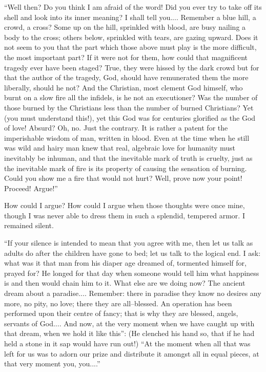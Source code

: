 \documentclass[11pt,openany]{book}
\begin{document}
``Well then? Do you think I am afraid of the word! Did you ever try to take off its shell and look into its inner meaning? I shall tell you.... Remember a blue hill, a crowd, a cross? Some up on the hill, sprinkled with blood, are busy nailing a body to the cross; others below, sprinkled with tears, are gazing upward. Does it not seem to you that the part which those above must play is the more difficult, the most important part? If it were not for them, how could that magnificent tragedy ever have been staged? True, they were hissed by the dark crowd but for that the author of the tragedy, God, should have remunerated them the more liberally, should he not? And the Christian, most clement God himself, who burnt on a slow fire all the infidels, is he not an executioner? Was the number of those burned by the Christians less than the number of burned Christians? Yet (you must understand this!), yet this God was for centuries glorified as the God of love! Absurd? Oh, no. Just the contrary. It is rather a patent for the imperishable wisdom of man, written in blood. Even at the time when he still was wild and hairy man knew that real, algebraic love for humanity must inevitably be inhuman, and that the inevitable mark of truth is cruelty, just as the inevitable mark of fire is its property of causing the sensation of burning. Could you show me a fire that would not hurt? Well, prove now your point! Proceed! Argue!''

How could I argue? How could I argue when those thoughts were once mine, though I was never able to dress them in such a splendid, tempered armor. I remained silent.

``If your silence is intended to mean that you agree with me, then let us talk as adults do after the children have gone to bed; let us talk to the logical end. I ask: what was it that man from his diaper age dreamed of, tormented himself for, prayed for? He longed for that day when someone would tell him what happiness is and then would chain him to it. What else are we doing now? The ancient dream about a paradise.... Remember: there in paradise they know no desires any more, no pity, no love; there they are all--blessed. An operation has been performed upon their centre of fancy; that is why they are blessed, angels, servants of God.... And now, at the very moment when we have caught up with that dream, when we hold it like this'': (He clenched his hand so, that if he had held a stone in it sap would have run out!) ``At the moment when all that was left for us was to adorn our prize and distribute it amongst all in equal pieces, at that very moment you, you....''
\end{document}

